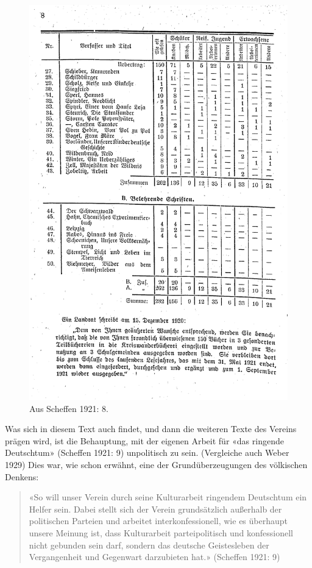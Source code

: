 \documentclass[a4paper,
fontsize=11pt,
oneside,
numbers=noperiodatend,
parskip=half-,
bibliography=totoc,
final
]{scrartcl}
\begin{document}
\begin{figure}
\centering
\includegraphics{img/scheffen_statistik_2.jpg}
\caption{Aus Scheffen 1921: 8.}
\end{figure}

Was sich in diesem Text auch findet, und dann die weiteren Texte des
Vereins prägen wird, ist die Behauptung, mit der eigenen Arbeit für «das
ringende Deutschtum» (Scheffen 1921: 9) unpolitisch zu sein. (Vergleiche
auch Weber 1929) Dies war, wie schon erwähnt, eine der
Grundüberzeugungen des völkischen Denkens:

\begin{quote}
«So will unser Verein durch seine Kulturarbeit ringendem Deutschtum ein
Helfer sein. Dabei stellt sich der Verein grundsätzlich außerhalb der
politischen Parteien und arbeitet interkonfessionell, wie es überhaupt
unsere Meinung ist, dass Kulturarbeit parteipolitisch und konfessionell
nicht gebunden sein darf, sondern das deutsche Geistesleben der
Vergangenheit und Gegenwart darzubieten hat.» (Scheffen 1921: 9)
\end{quote}
\end{document}
